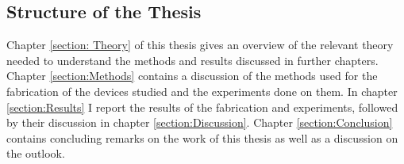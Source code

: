 \subsection{Structure of the Thesis}

Chapter \ref{section: Theory} of this thesis gives an overview of the relevant theory needed to understand the methods and results discussed in further chapters. Chapter \ref{section:Methods} contains a discussion of the methods used for the fabrication of the devices studied and the experiments done on them. In chapter \ref{section:Results} I report the results of the fabrication and experiments, followed by their discussion in chapter \ref{section:Discussion}. Chapter \ref{section:Conclusion} contains concluding remarks on the work of this thesis as well as a discussion on the outlook. 


